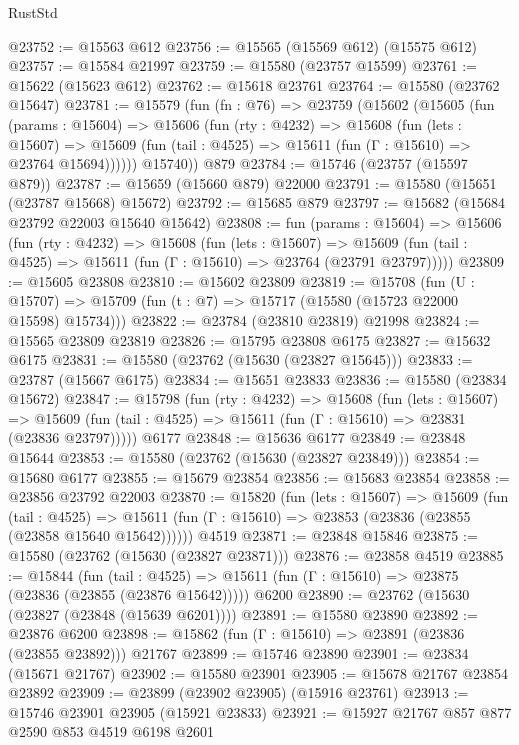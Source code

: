 \begin{lexlean}{RustStd}
\begin{coremodule}
@23752 := @15563 @612
@23756 := @15565 (@15569 @612) (@15575 @612)
@23757 := @15584 @21997
@23759 := @15580 (@23757 @15599)
@23761 := @15622 (@15623 @612)
@23762 := @15618 @23761
@23764 := @15580 (@23762 @15647)
@23781 := @15579
    (fun (fn : @76) =>
    @23759
      (@15602
        (@15605
          (fun (params : @15604) =>
          @15606
            (fun (rty : @4232) =>
            @15608
              (fun (lets : @15607) =>
              @15609 (fun (tail : @4525) => @15611 (fun (Γ : @15610) => @23764 @15694))))))
        @15740))
    @879
@23784 := @15746 (@23757 (@15597 @879))
@23787 := @15659 (@15660 @879) @22000
@23791 := @15580 (@15651 (@23787 @15668) @15672)
@23792 := @15685 @879
@23797 := @15682 (@15684 @23792 @22003 @15640 @15642)
@23808 := fun (params : @15604) =>
  @15606
    (fun (rty : @4232) =>
    @15608
      (fun (lets : @15607) =>
      @15609 (fun (tail : @4525) => @15611 (fun (Γ : @15610) => @23764 (@23791 @23797)))))
@23809 := @15605 @23808
@23810 := @15602 @23809
@23819 := @15708
    (fun (U : @15707) => @15709 (fun (t : @7) => @15717 (@15580 (@15723 @22000 @15598) @15734)))
@23822 := @23784 (@23810 @23819) @21998
@23824 := @15565 @23809 @23819
@23826 := @15795 @23808 @6175
@23827 := @15632 @6175
@23831 := @15580 (@23762 (@15630 (@23827 @15645)))
@23833 := @23787 (@15667 @6175)
@23834 := @15651 @23833
@23836 := @15580 (@23834 @15672)
@23847 := @15798
    (fun (rty : @4232) =>
    @15608
      (fun (lets : @15607) =>
      @15609 (fun (tail : @4525) => @15611 (fun (Γ : @15610) => @23831 (@23836 @23797)))))
    @6177
@23848 := @15636 @6177
@23849 := @23848 @15644
@23853 := @15580 (@23762 (@15630 (@23827 @23849)))
@23854 := @15680 @6177
@23855 := @15679 @23854
@23856 := @15683 @23854
@23858 := @23856 @23792 @22003
@23870 := @15820
    (fun (lets : @15607) =>
    @15609
      (fun (tail : @4525) =>
      @15611 (fun (Γ : @15610) => @23853 (@23836 (@23855 (@23858 @15640 @15642))))))
    @4519
@23871 := @23848 @15846
@23875 := @15580 (@23762 (@15630 (@23827 @23871)))
@23876 := @23858 @4519
@23885 := @15844
    (fun (tail : @4525) => @15611 (fun (Γ : @15610) => @23875 (@23836 (@23855 (@23876 @15642)))))
    @6200
@23890 := @23762 (@15630 (@23827 (@23848 (@15639 @6201))))
@23891 := @15580 @23890
@23892 := @23876 @6200
@23898 := @15862 (fun (Γ : @15610) => @23891 (@23836 (@23855 @23892))) @21767
@23899 := @15746 @23890
@23901 := @23834 (@15671 @21767)
@23902 := @15580 @23901
@23905 := @15678 @21767 @23854 @23892
@23909 := @23899 (@23902 @23905) (@15916 @23761)
@23913 := @15746 @23901 @23905 (@15921 @23833)
@23921 := @15927 @21767 @857 @877 @2590 @853 @4519 @6198 @2601

\end{coremodule}
\end{lexlean}
